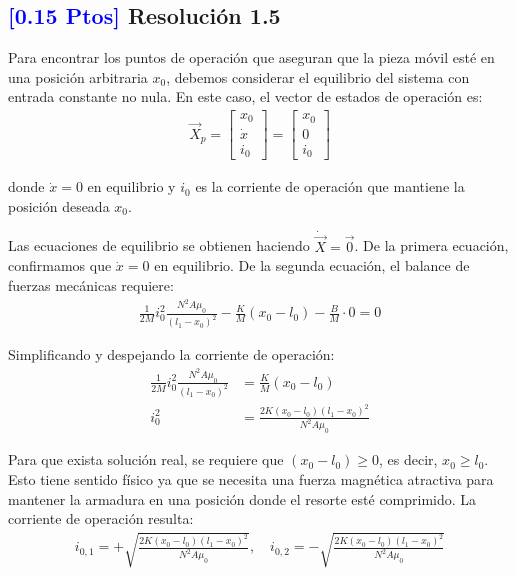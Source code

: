 \documentclass[
  11pt,
  letterpaper,
   addpoints,
   answers
  ]{exam}
\begin{document}
\begin{solution}
\subsection*{\textcolor{blue}{[0.15 Ptos]} Resolución 1.5}

Para encontrar los puntos de operación que aseguran que la pieza móvil esté en una posición arbitraria $x_0$, debemos considerar el equilibrio del sistema con entrada constante no nula. En este caso, el vector de estados de operación es:
\begin{align}
\vec{X}_p = \begin{bmatrix}
x_0 \\
\dot{x} \\
i_0
\end{bmatrix} = \begin{bmatrix}
x_0 \\
0 \\
i_0
\end{bmatrix}
\end{align}

donde $\dot{x} = 0$ en equilibrio y $i_0$ es la corriente de operación que mantiene la posición deseada $x_0$.

Las ecuaciones de equilibrio se obtienen haciendo $\dot{\vec{X}} = \vec{0}$. De la primera ecuación, confirmamos que $\dot{x} = 0$ en equilibrio. De la segunda ecuación, el balance de fuerzas mecánicas requiere:
\begin{align}
\frac{1}{2M} i_0^2 \frac{N^2 A \mu_0}{(l_1 - x_0)^2} - \frac{K}{M}(x_0 - l_0) - \frac{B}{M} \cdot 0 = 0
\end{align}

Simplificando y despejando la corriente de operación:
\begin{align}
\frac{1}{2M} i_0^2 \frac{N^2 A \mu_0}{(l_1 - x_0)^2} &= \frac{K}{M}(x_0 - l_0)\\
i_0^2 &= \frac{2K(x_0 - l_0)(l_1 - x_0)^2}{N^2 A \mu_0}
\end{align}

Para que exista solución real, se requiere que $(x_0 - l_0) \geq 0$, es decir, $x_0 \geq l_0$. Esto tiene sentido físico ya que se necesita una fuerza magnética atractiva para mantener la armadura en una posición donde el resorte esté comprimido. La corriente de operación resulta:
\begin{align}
i_{0,1} = +\sqrt{\frac{2K(x_0 - l_0)(l_1 - x_0)^2}{N^2 A \mu_0}}, \quad i_{0,2} = -\sqrt{\frac{2K(x_0 - l_0)(l_1 - x_0)^2}{N^2 A \mu_0}}
\end{align}


\end{solution}
\end{document}
